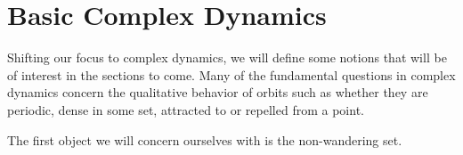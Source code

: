\documentclass{amsart}
\theoremstyle{definition}
\theoremstyle{remark}
\numberwithin{equation}{section}
\begin{document}







\section{Basic Complex Dynamics}

Shifting our focus to complex dynamics, we will define some notions that will be of interest in the sections to come. Many of the fundamental questions in complex dynamics concern the qualitative behavior of orbits such as whether they are periodic, dense in some set, attracted to or repelled from a point.

The first object we will concern ourselves with is the non-wandering set.
\end{document}

